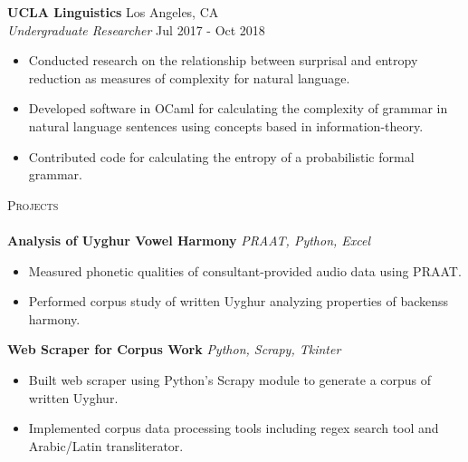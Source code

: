 \documentclass[]{article}
\newcommand{\lineunder} {
    \vspace*{-8pt} \\
    \hspace*{-18pt} \hrulefill \\
}
\newcommand{\header} [1] {
    {\hspace*{-18pt}\vspace*{6pt} \textsc{#1}}
    \vspace*{-6pt} \lineunder
}
\begin{document}
\textbf{UCLA Linguistics} \hfill Los Angeles, CA\\
\textit{Undergraduate Researcher} \hfill Jul 2017 - Oct 2018\\
\vspace{-3mm}
\begin{itemize} \itemsep 0pt
	\item Conducted research on the relationship between surprisal and entropy reduction as measures of complexity for natural language.
	\item Developed software in OCaml for calculating the complexity of grammar in natural language sentences using concepts based in information-theory.
	\item Contributed code for calculating the entropy of a probabilistic formal grammar.
\end{itemize}

\header{Projects}
{\textbf{Analysis of Uyghur Vowel Harmony}} \hspace*{5mm} {\sl PRAAT, Python, Excel}
\vspace*{-5pt}\begin{itemize}	\itemsep 0pt 
	\item Measured phonetic qualities of consultant-provided audio data using PRAAT.
	\item Performed corpus study of written Uyghur analyzing properties of backenss harmony.
\end{itemize}
\vspace*{0mm}

{\textbf{Web Scraper for Corpus Work}} \hspace*{5mm} {\sl Python, Scrapy, Tkinter}
\vspace*{-5pt}\begin{itemize}	\itemsep 0pt 
	\item Built web scraper using Python's Scrapy module to generate a corpus of written Uyghur.
	\item Implemented corpus data processing tools including regex search tool and Arabic/Latin transliterator.
\end{itemize}
\vspace*{0mm}
\end{document}

